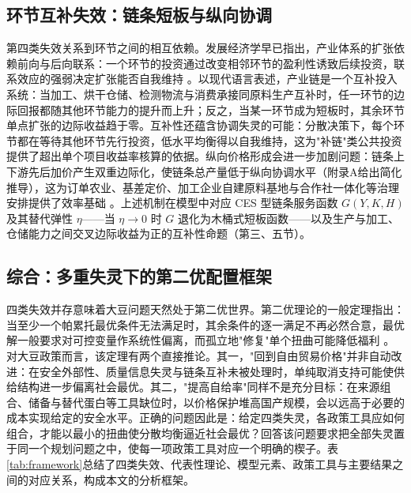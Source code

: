 \documentclass[UTF8,zihao=-4,fontset=fandol]{ctexart}
\numberwithin{equation}{section}
\theoremstyle{definition}
\theoremstyle{remark}
\begin{document}
\subsection{环节互补失效：链条短板与纵向协调}

第四类失效关系到环节之间的相互依赖。发展经济学早已指出，产业体系的扩张依赖前向与后向联系：一个环节的投资通过改变相邻环节的盈利性诱致后续投资，联系效应的强弱决定扩张能否自我维持 \parencite{Hirschman1958}。以现代语言表述，产业链是一个互补投入系统：当加工、烘干仓储、检测物流与消费承接同原料生产互补时，任一环节的边际回报都随其他环节能力的提升而上升；反之，当某一环节成为短板时，其余环节单点扩张的边际收益趋于零。互补性还蕴含协调失灵的可能：分散决策下，每个环节都在等待其他环节先行投资，低水平均衡得以自我维持，这为"补链"类公共投资提供了超出单个项目收益率核算的依据。纵向价格形成会进一步加剧问题：链条上下游先后加价产生双重边际化，使链条总产量低于纵向协调水平（附录A给出简化推导），这为订单农业、基差定价、加工企业自建原料基地与合作社一体化等治理安排提供了效率基础 \parencite{Spengler1950}。上述机制在模型中对应 CES 型链条服务函数 $G(Y,K,H)$ 及其替代弹性 $\eta$——当 $\eta\rightarrow0$ 时 $G$ 退化为木桶式短板函数——以及生产与加工、仓储能力之间交叉边际收益为正的互补性命题（第三、五节）。

\subsection{综合：多重失灵下的第二优配置框架}

四类失效并存意味着大豆问题天然处于第二优世界。第二优理论的一般定理指出：当至少一个帕累托最优条件无法满足时，其余条件的逐一满足不再必然合意，最优解一般要求对可控变量作系统性偏离，而孤立地"修复"单个扭曲可能降低福利 \parencite{LipseyLancaster1956}。对大豆政策而言，该定理有两个直接推论。其一，"回到自由贸易价格"并非自动改进：在安全外部性、质量信息失灵与链条互补未被处理时，单纯取消支持可能使供给结构进一步偏离社会最优。其二，"提高自给率"同样不是充分目标：在来源组合、储备与替代蛋白等工具缺位时，以价格保护堆高国产规模，会以远高于必要的成本实现给定的安全水平。正确的问题因此是：给定四类失灵，各政策工具应如何组合，才能以最小的扭曲使分散均衡逼近社会最优？回答该问题要求把全部失灵置于同一个规划问题之中，使每一项政策工具对应一个明确的楔子。表\ref{tab:framework}总结了四类失效、代表性理论、模型元素、政策工具与主要结果之间的对应关系，构成本文的分析框架。
\end{document}
